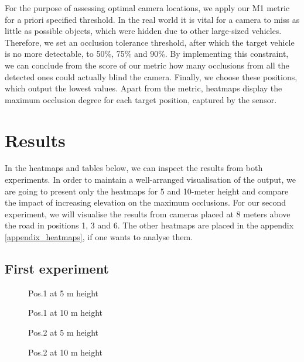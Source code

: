 For the purpose of assessing optimal camera locations, we apply our M1 metric for a priori specified threshold. In the real world it is vital for a camera to miss as little as possible objects, which were hidden due to other large-sized vehicles. Therefore, we set an occlusion tolerance threshold, after which the target vehicle is no more detectable, to 50\%, 75\% and 90\%. By implementing this constraint, we can conclude from the score of our metric how many occlusions from all the detected ones could actually blind the camera. Finally, we choose these positions, which output the lowest values. Apart from the metric, heatmaps display the maximum occlusion degree for each target position, captured by the sensor.

\section{Results}\label{results}
In the heatmaps and tables below, we can inspect the results from both experiments. In order to maintain a well-arranged visualisation of the output, we are going to present only the heatmaps for 5 and 10-meter height and compare the impact of increasing elevation on the maximum occlusions. For our second experiment, we will visualise the results from cameras placed at 8 meters above the road in positions 1, 3 and 6. The other heatmaps are placed in the appendix 
\ref{appendix_heatmaps}, if one wants to analyse them.

\subsection{First experiment} \label{subsec:first_exp_heat}

\begin{figure}[!htb]
  
  \caption{Pos.1 at 5 m height}\label{fig:pos1_5m}
\endminipage\hfill
{}
  
  \caption{Pos.1 at 10 m height}\label{fig:pos1_10m}
\endminipage\hfill
\end{figure}

\newpage
\begin{figure}[!ht]
  
  \caption{Pos.2 at 5 m height}\label{fig:pos2_5m}
\endminipage\hfill
{}
  
  \caption{Pos.2 at 10 m height}\label{fig:pos2_10m}
\endminipage\hfill
\end{figure}

